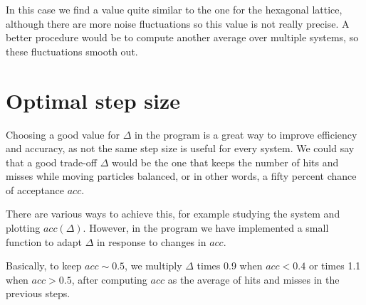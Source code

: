 \documentclass[10 pt]{article}
\begin{document}
In this case we find a value quite similar to the one for the hexagonal lattice, although there are more noise fluctuations so this value is not really precise. A better procedure would be to compute another average over multiple systems, so these fluctuations smooth out.

\section{Optimal step size}

Choosing a good value for $\Delta$ in the program is a great way to improve efficiency and accuracy, as not the same step size is useful for every system. We could say that a good trade-off $\Delta$ would be the one that keeps the number of hits and misses while moving particles balanced, or in other words, a fifty percent chance of acceptance $acc$.

There are various ways to achieve this, for example studying the system and plotting $acc(\Delta)$. However, in the program we have implemented a small function to adapt $\Delta$ in response to changes in $acc$.

Basically, to keep $acc \sim 0.5$, we multiply $\Delta$ times 0.9 when $acc < 0.4$ or times 1.1 when $acc > 0.5$, after computing $acc$ as the average of hits and misses in the previous steps.
\end{document}
